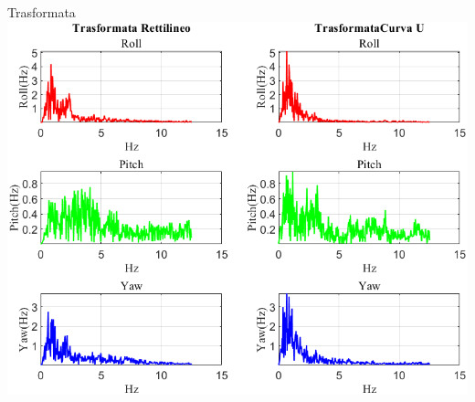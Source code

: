 \documentclass[beamer]{standalone}
\begin{document}
	
%	
%	
%	
%	
%	
	
	\begin{frame}{{Trasformata}}
		\centering\includegraphics[height=.8\textheight]{figure/VAng/Trasformata/Trasformata}
	\end{frame}
	
\end{document}
